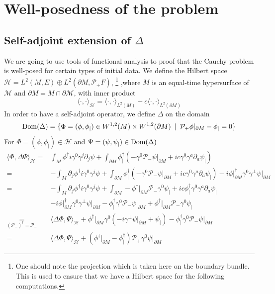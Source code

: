 \section{Well-posedness of the problem}\label{wen-sect-saw}
\subsection{Self-adjoint extension of $\Delta$}
We are going to use tools of functional analysis to proof that the Cauchy problem is well-posed for certain types of initial data.
We define the Hilbert space $\mathcal{H} = L^{2}(M,E)\oplus L^{2}(\partial M, \mathcal{P}_+ F)$,
\footnote{
One should note the projection which is taken here on the boundary bundle.
This is used to ensure that we have a Hilbert space for the following computations.
}
,where $M$ is an equal-time hypersurface of $\mathcal{M}$ and $\partial M = M\cap \partial \mathcal{M}$,
with inner product
\begin{equation}\label{wen-innerpdt}
\langle \cdot, \cdot \rangle _\mathcal{H} = \langle \cdot, \cdot \rangle _{L^2(M)} + c \langle \cdot, \cdot \rangle _{L^2(\partial M)}
\end{equation}
In order to have a self-adjoint operator, we define $\Delta$ on the domain
\begin{equation*}
\mathrm{Dom}( \Delta) = \{ \Phi = (\phi, \phi_|) \in W^{1,2}(M)\times W^{1,2}(
\partial M)\enskip | \enskip \mathcal{P}_+\phi \vert_{\partial M} - \phi_| = 0 \}
\end{equation*}  
For $\Phi = (\phi, \phi_|) \in \mathcal{H}$ and $ \Psi = (\psi, \psi_|)\in\mathrm{Dom}(\Delta)$
\begin{equation}
\begin{split}
\langle \Phi, \Delta \Psi \rangle _\mathcal{H}
 = & \int_M \phi^\dagger i \gamma^0 \gamma^j \partial_j \psi 
+ \int_{\partial M} \phi^\dagger_|(  -\gamma^0\mathcal{P}_- \psi\vert_{\partial M} + ic \gamma^0 \gamma^a \partial_a\psi_|)   \\
 = & - \int_M \partial_j \phi^\dagger i \gamma^0 \gamma^j \psi 
+ \int_{\partial M} \phi^\dagger_|(-\gamma^0 \mathcal{P}_- \psi\vert_{\partial M} + ic \gamma^0 \gamma^a \partial_a  \psi_|) 
- i\phi\vert_{\partial M}^\dagger \gamma^0 \gamma^\bot \psi\vert_{\partial M}   \\
= &
- \int_M \partial_j \phi^\dagger i \gamma^0 \gamma^j \psi 
+ \int_{\partial M} - \phi^\dagger\vert_{\partial M}\mathcal{P}_- \gamma^0 \psi_| + ic \phi^\dagger_|\gamma^0 \gamma^a \partial_a  \psi_|  \\
& - i \phi\vert_{\partial M}^\dagger \gamma^0 \gamma^\bot \psi\vert_{\partial M} 
-\phi_|^\dagger \gamma^0 \mathcal{P}_- \psi\vert_{\partial M} 
+ \phi^\dagger\vert_{\partial M}\mathcal{P}_- \gamma^0 \psi_| \\
\underset{(\mathcal{P}_-)^\dagger = \mathcal{P}_-}{=} 
& \langle \Delta\Phi, \Psi \rangle_\mathcal{H}
+\phi^\dagger\vert_{\partial M} \gamma^0 (-i \gamma^\bot \psi\vert_{\partial M} + \psi_|)
- \phi_|^\dagger \gamma^0 \mathcal{P}_- \psi\vert_{\partial M} \\
= & \langle \Delta\Phi, \Psi \rangle_\mathcal{H}
+ (\phi^\dagger\vert_{\partial M} - \phi_|^\dagger)\mathcal{P}_+ \gamma^0 \psi\vert_{\partial M}
\end{split}
\end{equation}

